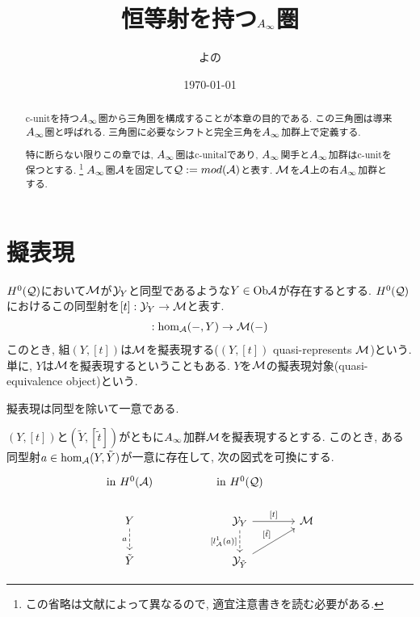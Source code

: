 \documentclass[uplatex, a4paper, 14Q, dvipdfmx]{jsarticle}
\title{恒等射を持つ\texorpdfstring{$A_{\infty}$}{Ainf}圏}
\author{よの}
\date{\today}
\begin{document}
\maketitle

\begin{abstract}
  c-unitを持つ$A_{\infty}$圏から三角圏を構成することが本章の目的である. 
  この三角圏は導来$A_{\infty}$圏と呼ばれる. 
  三角圏に必要なシフトと完全三角を$A_{\infty}$加群上で定義する. 

  特に断らない限りこの章では, $A_{\infty}$圏はc-unitalであり, $A_{\infty}$関手と$A_{\infty}$加群はc-unitを保つとする.
  \footnote{
    この省略は文献によって異なるので, 適宜注意書きを読む必要がある. 
  }
  $A_{\infty}$圏$\mathcal{A}$を固定して$\mathcal{Q} := mod (\mathcal{A})$と表す. 
  $\mathcal{M}$を$\mathcal{A}$上の右$A_{\infty}$加群とする. 
\end{abstract}

\tableofcontents

\section{擬表現}

\begin{definition}[擬表現]
  $H^0(\mathcal{Q})$において$\mathcal{M}$が$\mathcal{Y}_Y$と同型であるような$Y \in \mathrm{Ob}\mathcal{A}$が存在するとする.  
  $H^0(\mathcal{Q})$におけるこの同型射を$[t] : \mathcal{Y}_Y \to \mathcal{M}$と表す. 
  \begin{align*}
    [t] : \hom_\A(-,Y) \to \M(-)
  \end{align*}
  このとき, 組$(Y,[t])$は$\mathcal{M}$を擬表現する($(Y,[t])$ quasi-represents $\mathcal{M}$)という. 
  単に, $Y$は$\mathcal{M}$を擬表現するということもある.
  $Y$を$\mathcal{M}$の擬表現対象(quasi-equivalence object)という. 
\end{definition}

擬表現は同型を除いて一意である. 

\begin{lemma}
  $(Y,[t])$と$(\tilde{Y}, [\tilde{t}])$がともに$A_{\infty}$加群$\mathcal{M}$を擬表現するとする.
  このとき, ある同型射$a \in \hom_{\mathcal{A}}(Y,\tilde{Y})$が一意に存在して, 次の図式を可換にする. 
  \[\begin{tikzcd}
    {\mathrm{in} ~ H^0(\A)} && {\mathrm{in} ~ H^0(\Q)} \\
    Y && {\Y_Y} & \M \\
    {\tilde{Y}} && {\Y_{\tilde{Y}}}
    \arrow["a"', dashed, from=2-1, to=3-1]
    \arrow["{[l_\A^1(a)]}"', dashed, from=2-3, to=3-3]
    \arrow["{[t]}", from=2-3, to=2-4]
    \arrow["{[\tilde{t}]}", from=3-3, to=2-4]
  \end{tikzcd}\]
\end{lemma}
\end{document}
